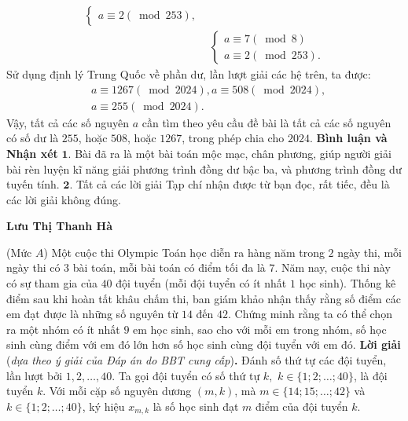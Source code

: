 \begin{multicols}{2}
\begin{align*}
\begin{cases}
			a \equiv 2\left( {\bmod 253} \right),
		\end{cases}\\
		&\begin{cases}
			a \equiv 7\left( {\bmod 8} \right)\\
			a \equiv 2\left( {\bmod 253} \right).
		\end{cases}
	\end{align*}
	Sử dụng định lý Trung Quốc về phần dư, lần lượt giải các hệ trên, ta được:
	\begin{align*}
		&a \equiv 1267\left( {\bmod 2024} \right), a \equiv 508\left( {\bmod 2024} \right),\\
		&a \equiv 255\left( {\bmod 2024} \right).
	\end{align*}
	Vậy, tất cả các số nguyên $a$ cần tìm theo yêu cầu đề bài là tất cả các số nguyên có số dư là $255$, hoặc $508$, hoặc $1267$, trong phép chia cho $2024$.
	\vskip 0.05cm
	\textbf{\color{thachthuctoanhoc}Bình luận và Nhận xét}
	\vskip 0.05cm
	$\pmb{1.}$ Bài đã ra là một bài toán mộc mạc, chân phương, giúp người giải bài rèn luyện kĩ năng giải phương trình đồng dư bậc ba, và phương trình đồng dư tuyến tính.
	\vskip 0.05cm
	$\pmb{2.}$ Tất cả các lời giải Tạp chí nhận được từ bạn đọc, rất tiếc, đều là các lời giải không đúng.
	\begin{flushright}
		\textbf{\color{thachthuctoanhoc}Lưu Thị Thanh Hà}
	\end{flushright}
	{}
	(Mức $A$) Một cuộc thi Olympic Toán học diễn ra hàng năm trong $2$ ngày thi, mỗi ngày thi có $3$ bài toán, mỗi bài toán có điểm tối đa là $7$. Năm nay, cuộc thi này có sự tham gia của $40$ đội tuyển (mỗi đội tuyển có ít nhất $1$ học sinh). Thống kê điểm sau khi hoàn tất khâu chấm thi,  ban giám khảo nhận thấy rằng số điểm các em đạt được là những số nguyên từ $14$ đến $42$. 
	Chứng minh rằng ta có thể chọn ra một nhóm có ít nhất $9$ em học sinh, sao cho với mỗi em trong nhóm, số học sinh cùng điểm với em đó lớn hơn số học sinh cùng đội tuyển với em đó.
	\vskip 0.05cm
	\textbf{\color{thachthuctoanhoc}Lời giải} (\textit{dựa theo ý giải của Đáp án do BBT cung cấp})\textbf{\color{thachthuctoanhoc}.}
	\vskip 0.05cm
	Đánh số thứ tự các đội tuyển, lần lượt bởi $1, 2, \ldots, 40$.
	\vskip 0.05cm
	Ta gọi đội tuyển có số thứ tự $k,$ \linebreak$k \in \{1; 2; \ldots; 40\}$, là đội tuyển $k$.
	\vskip 0.05cm
	Với mỗi cặp số nguyên dương $(m, k)$, mà $m \in \{14; 15; \ldots; 42\}$ và $k \in \{1; 2; \ldots; 40\}$, ký hiệu $x_{m,k}$  là số học sinh đạt $m$ điểm của đội tuyển $k$.

\end{multicols}
